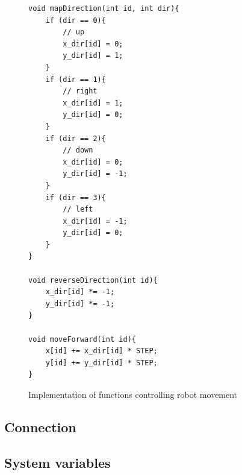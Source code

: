 \begin{figure}
\caption{Implementation of functions controlling robot movement}
\begin{lstlisting}[style=code]
void mapDirection(int id, int dir){
    if (dir == 0){
		// up
        x_dir[id] = 0;
        y_dir[id] = 1;
    }
    if (dir == 1){
		// right
        x_dir[id] = 1;
        y_dir[id] = 0;
    }
    if (dir == 2){
		// down
        x_dir[id] = 0;
        y_dir[id] = -1;
    }
    if (dir == 3){
		// left
        x_dir[id] = -1;
        y_dir[id] = 0;
    }
}

void reverseDirection(int id){
	x_dir[id] *= -1;
	y_dir[id] *= -1;
}

void moveForward(int id){
	x[id] += x_dir[id] * STEP;
	y[id] += y_dir[id] * STEP;
}
\end{lstlisting}
\label{fig:movement_implementation}
\end{figure}



\subsection{Connection}



\subsection{System variables}
